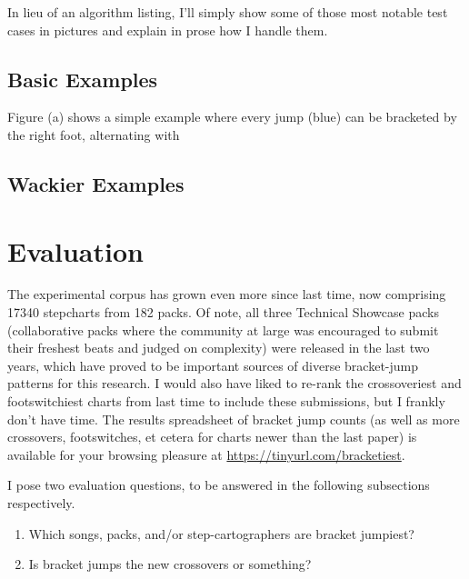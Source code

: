 \documentclass[10pt]{sigplanconf}
\begin{document}
In lieu of an algorithm listing, I'll simply show some of those most notable test cases in pictures and explain in prose how I handle them.


\subsection{Basic Examples}

Figure (a) shows a simple example where every jump (blue)
can be bracketed by the right foot,
alternating with 

\subsection{Wackier Examples}


\section{Evaluation}

The experimental corpus has grown even more since last time, now comprising %
17340 %
stepcharts from 182 packs.
Of note, all three Technical Showcase packs
(collaborative packs where the community at large was encouraged to submit their freshest beats and judged on complexity)
were released in the last two years,
which have proved to be important sources of diverse bracket-jump patterns for this research.
I would also have liked to re-rank the crossoveriest and footswitchiest charts from last time to include these submissions,
but I frankly don't have time.
The results spreadsheet of bracket jump counts
(as well as more crossovers, footswitches, et cetera for charts newer than the last paper)
is available for your browsing pleasure at
\url{https://tinyurl.com/bracketiest}.


I pose two evaluation questions, to be answered in the following subsections respectively.
\begin{enumerate}
	\item Which songs, packs, and/or step-cartographers are bracket jumpiest?
	\item Is bracket jumps the new crossovers or something?
\end{enumerate}
\end{document}
